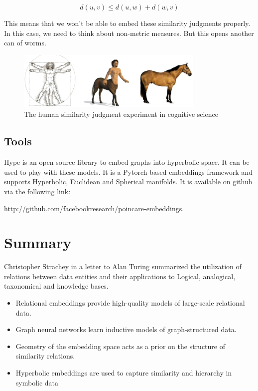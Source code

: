 \begin{equation} \label{eq:triangleIne}
    d(u,v) \leq d(u, w) + d(w, v)
\end{equation}

This means that we won't be able to embed these similarity judgments properly. In this case, we need to think about non-metric measures. But this opens another can of worms.

\begin{figure}[htb]
  \begin{center}
    \includegraphics[width=0.8\textwidth]{figs/3-cog.png}
    \caption{The human similarity judgment experiment in cognitive science}
    \label{fig:3-cog}
    \end{center}
\end{figure}

\subsection{Tools}

Hype is an open source library to embed graphs into hyperbolic space. It can be used to play with these models. It is a Pytorch-based embeddings framework and supports Hyperbolic, Euclidean and Spherical manifolds. It is available on github via the following link:

http://github.com/facebookresearch/poincare-embeddings.


\section{Summary}

Christopher Strachey in a letter to Alan Turing summarized the utilization of relations  between data entities and their applications to Logical, analogical, taxonomical and knowledge bases.


\begin{itemize}
    \item Relational embeddings provide high-quality models of large-scale relational data.
    \item Graph neural networks learn inductive models of graph-structured data.
    \item Geometry of the embedding space acts as a prior on the structure of similarity relations.
    \item Hyperbolic embeddings are used to capture similarity and hierarchy in symbolic data
\end{itemize}
